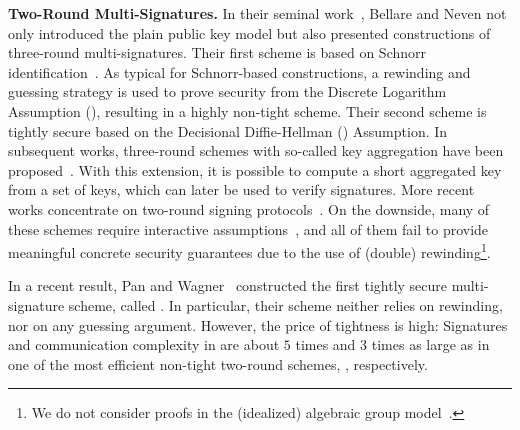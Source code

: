 \documentclass[version=final]{iacrcc}
\theoremstyle{mytheorem}				\newtheorem{theorem}{Theorem}
\theoremstyle{myplain}
\theoremstyle{mydefinition}
\theoremstyle{myremark}
\begin{document}
\smallskip\noindent\textbf{Two-Round Multi-Signatures.} 
In their seminal work~\cite{CCS:BelNev06}, Bellare and Neven not only introduced the plain public key model but also presented constructions of three-round multi-signatures.
Their first scheme is based on Schnorr identification~\cite{JC:Schnorr91}.
As typical for Schnorr-based constructions, a rewinding and guessing strategy is used to prove security from the Discrete Logarithm Assumption (\dlog), resulting in a highly non-tight scheme. 
Their second scheme is tightly secure based on the Decisional Diffie-Hellman (\ddh) Assumption.
In subsequent works, three-round schemes with so-called key aggregation have been proposed~\cite{DBLP:journals/dcc/MaxwellPSW19,AC:BonDriNev18,DBLP:journals/ijnc/FukumitsuH21}.
With this extension, it is possible to compute a short aggregated key from a set of keys, which can later be used to verify signatures.
More recent works concentrate on two-round signing protocols~\cite{CCS:NRSW20,C:NicRufSeu21,AC:BelDai21,C:AlpBur21,EPRINT:CriKomMal21,PKC:DOTT21,C:BosTakTib22,EC:TesZhu23a}.
On the downside, many of these schemes require interactive assumptions~\cite{C:NicRufSeu21,EPRINT:CriKomMal21,C:AlpBur21}, and all of them fail to provide meaningful concrete security guarantees due to the use of (double) rewinding\footnote{We do not consider proofs in the (idealized) algebraic group model~\cite{C:FucKilLos18}.}.

In a recent result, Pan and Wagner~\cite{EC:PanWag23} constructed the first tightly secure multi-signature scheme, called \ChopsticksTwo.
In particular, their scheme neither relies on rewinding, nor on any guessing argument.
However, the price of tightness is high: Signatures and communication complexity in \ChopsticksTwo are about $5$ times and $3$ times as large as in one of the most efficient non-tight two-round schemes, \HBMS, respectively.
\end{document}
